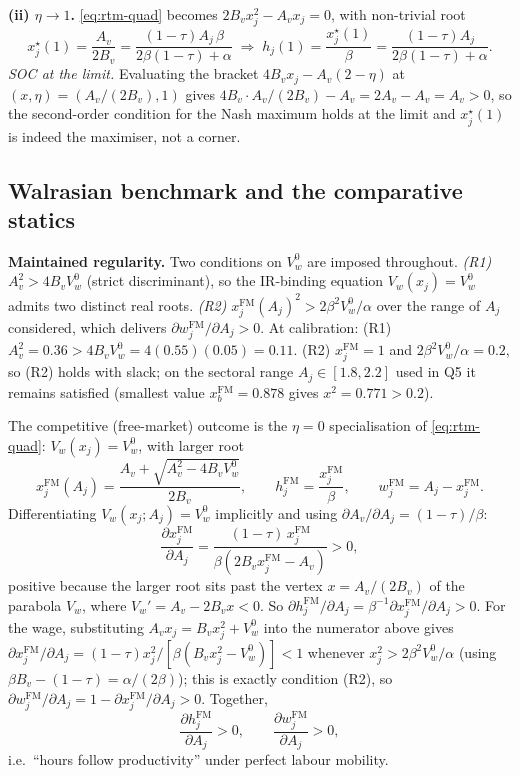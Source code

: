 \documentclass[a4paper,11pt]{article}
\begin{document}
\textbf{(ii) $\eta\to 1$.} \eqref{eq:rtm-quad} becomes $2B_vx_j^{2}-A_vx_j=0$, with non-trivial root
\[
x_j^{\star}(1)=\frac{A_v}{2B_v}=\frac{(1-\tau)A_j\,\beta}{2\beta(1-\tau)+\alpha}\;\Longrightarrow\;
h_j(1)=\frac{x_j^{\star}(1)}{\beta}=\frac{(1-\tau)A_j}{2\beta(1-\tau)+\alpha}.
\]
\emph{SOC at the limit.} Evaluating the bracket $4B_v x_j-A_v(2-\eta)$ at $(x,\eta)=(A_v/(2B_v),1)$ gives $4B_v\!\cdot\!A_v/(2B_v)-A_v\!=\!2A_v-A_v\!=\!A_v>0$, so the second-order condition for the Nash maximum holds at the limit and $x_j^{\star}(1)$ is indeed the maximiser, not a corner.

\subsection{Walrasian benchmark and the comparative statics}
\textbf{Maintained regularity.} Two conditions on $V_w^{0}$ are imposed throughout. \emph{(R1)} $A_v^{2}\!>\!4B_vV_w^{0}$ (strict discriminant), so the IR-binding equation $V_w(x_j)\!=\!V_w^{0}$ admits two distinct real roots. \emph{(R2)} $x_j^{\mathrm{FM}}(A_j)^{2}>2\beta^{2}V_w^{0}/\alpha$ over the range of $A_j$ considered, which delivers $\partial w_j^{\mathrm{FM}}/\partial A_j>0$. At calibration: (R1) $A_v^{2}\!=\!0.36>4B_vV_w^{0}\!=\!4(0.55)(0.05)\!=\!0.11$. (R2) $x_j^{\mathrm{FM}}\!=\!1$ and $2\beta^{2}V_w^{0}/\alpha\!=\!0.2$, so (R2) holds with slack; on the sectoral range $A_j\!\in\![1.8,2.2]$ used in Q5 it remains satisfied (smallest value $x_b^{\mathrm{FM}}\!=\!0.878$ gives $x^{2}\!=\!0.771>0.2$).

The competitive (free-market) outcome is the $\eta\!=\!0$ specialisation of \eqref{eq:rtm-quad}: $V_w(x_j)\!=\!V_w^{0}$, with larger root
\begin{equation}
x_j^{\mathrm{FM}}(A_j)=\frac{A_v+\sqrt{A_v^{2}-4B_v V_w^{0}}}{2B_v},\qquad h_j^{\mathrm{FM}}=\frac{x_j^{\mathrm{FM}}}{\beta},\qquad w_j^{\mathrm{FM}}=A_j-x_j^{\mathrm{FM}}.\label{eq:walras}
\end{equation}
Differentiating $V_w(x_j;A_j)\!=\!V_w^{0}$ implicitly and using $\partial A_v/\partial A_j=(1-\tau)/\beta$:
\[
\frac{\partial x_j^{\mathrm{FM}}}{\partial A_j}=\frac{(1-\tau)\,x_j^{\mathrm{FM}}}{\beta(2B_vx_j^{\mathrm{FM}}-A_v)}>0,
\]
positive because the larger root sits past the vertex $x\!=\!A_v/(2B_v)$ of the parabola $V_w$, where $V_w'\!=\!A_v\!-\!2B_vx<0$. So $\partial h_j^{\mathrm{FM}}/\partial A_j\!=\!\beta^{-1}\partial x_j^{\mathrm{FM}}/\partial A_j>0$. For the wage, substituting $A_v x_j\!=\!B_v x_j^{2}\!+\!V_w^{0}$ into the numerator above gives $\partial x_j^{\mathrm{FM}}/\partial A_j\!=\!(1-\tau)x_j^{2}/[\beta(B_vx_j^{2}-V_w^{0})]<1$ whenever $x_j^{2}\!>\!2\beta^{2}V_w^{0}/\alpha$ (using $\beta B_v\!-\!(1-\tau)\!=\!\alpha/(2\beta)$); this is exactly condition (R2), so $\partial w_j^{\mathrm{FM}}/\partial A_j\!=\!1-\partial x_j^{\mathrm{FM}}/\partial A_j>0$. Together,
\[
\frac{\partial h_j^{\mathrm{FM}}}{\partial A_j}>0,\qquad \frac{\partial w_j^{\mathrm{FM}}}{\partial A_j}>0,
\]
i.e.\ ``hours follow productivity'' under perfect labour mobility.
\end{document}
